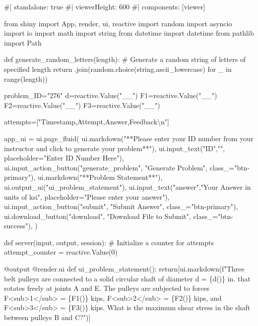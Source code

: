 \documentclass[
  letterpaper,
  DIV=11,
  numbers=noendperiod]{scrreprt}
\newenvironment{Shaded}{\begin{snugshade}}{\end{snugshade}}
\newcommand{\NormalTok}[1]{\textcolor[rgb]{0.00,0.23,0.31}{#1}}
\begin{document}
\begin{Shaded}
\begin{Highlighting}[]
\NormalTok{\#| standalone: true}
\NormalTok{\#| viewerHeight: 600}
\NormalTok{\#| components: [viewer]}

\NormalTok{from shiny import App, render, ui, reactive}
\NormalTok{import random}
\NormalTok{import asyncio}
\NormalTok{import io}
\NormalTok{import math}
\NormalTok{import string}
\NormalTok{from datetime import datetime}
\NormalTok{from pathlib import Path}

\NormalTok{def generate\_random\_letters(length):}
\NormalTok{    \# Generate a random string of letters of specified length}
\NormalTok{    return \textquotesingle{}\textquotesingle{}.join(random.choice(string.ascii\_lowercase) for \_ in range(length)) }

\NormalTok{problem\_ID="276"}
\NormalTok{d=reactive.Value("\_\_")}
\NormalTok{F1=reactive.Value("\_\_")}
\NormalTok{F2=reactive.Value("\_\_")}
\NormalTok{F3=reactive.Value("\_\_")}

\NormalTok{attempts=["Timestamp,Attempt,Answer,Feedback\textbackslash{}n"]}

\NormalTok{app\_ui = ui.page\_fluid(}
\NormalTok{    ui.markdown("**Please enter your ID number from your instructor and click to generate your problem**"),}
\NormalTok{    ui.input\_text("ID","", placeholder="Enter ID Number Here"),}
\NormalTok{    ui.input\_action\_button("generate\_problem", "Generate Problem", class\_="btn{-}primary"),}
\NormalTok{    ui.markdown("**Problem Statement**"),}
\NormalTok{    ui.output\_ui("ui\_problem\_statement"),}
\NormalTok{    ui.input\_text("answer","Your Answer in units of ksi", placeholder="Please enter your answer"),}
\NormalTok{    ui.input\_action\_button("submit", "Submit Answer", class\_="btn{-}primary"),}
\NormalTok{    ui.download\_button("download", "Download File to Submit", class\_="btn{-}success"),}
\NormalTok{)}


\NormalTok{def server(input, output, session):}
\NormalTok{    \# Initialize a counter for attempts}
\NormalTok{    attempt\_counter = reactive.Value(0)}

\NormalTok{    @output}
\NormalTok{    @render.ui}
\NormalTok{    def ui\_problem\_statement():}
\NormalTok{        return[ui.markdown(f"Three belt pulleys are connected to a solid circular shaft of diameter d = \{d()\} in. that rotates freely at joints A and E. The pulleys are subjected to forces F\textless{}sub\textgreater{}1\textless{}/sub\textgreater{} = \{F1()\} kips, F\textless{}sub\textgreater{}2\textless{}/sub\textgreater{} = \{F2()\} kips, and F\textless{}sub\textgreater{}3\textless{}/sub\textgreater{} = \{F3()\} kips. What is the maximum shear stress in the shaft between pulleys B and C?")]}
    

\end{Highlighting}
\end{Shaded}
\end{document}
